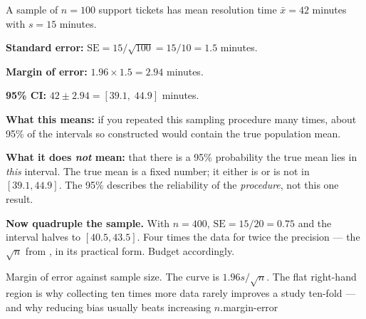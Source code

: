 \begin{worked}
A sample of $n = 100$ support tickets has mean resolution time
$\bar{x} = 42$ minutes with $s = 15$ minutes.

\smallskip
\textbf{Standard error:} $\text{SE} = 15/\sqrt{100} = 15/10 = 1.5$ minutes.

\textbf{Margin of error:} $1.96 \times 1.5 = 2.94$ minutes.

\textbf{95\% CI:} $42 \pm 2.94 = [39.1,\; 44.9]$ minutes.

\smallskip
\textbf{What this means:} if you repeated this sampling procedure many times, about
95\% of the intervals so constructed would contain the true population mean.

\textbf{What it does \emph{not} mean:} that there is a 95\% probability the true
mean lies in \emph{this} interval. The true mean is a fixed number; it either is or
is not in $[39.1, 44.9]$. The 95\% describes the reliability of the
\emph{procedure}, not this one result.

\smallskip
\textbf{Now quadruple the sample.} With $n = 400$, $\text{SE} = 15/20 = 0.75$ and
the interval halves to $[40.5, 43.5]$. Four times the data for twice the precision
--- the $\sqrt{n}$ from , in its practical form. Budget
accordingly.
\end{worked}

%
{Margin of error against sample size. The curve is $1.96s/\sqrt{n}$. The flat right-hand
region is why collecting ten times more data rarely improves a study ten-fold --- and why
reducing bias usually beats increasing $n$.}{margin-error}

